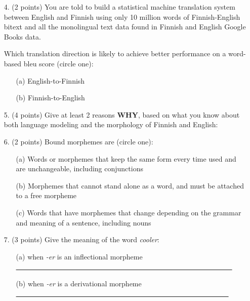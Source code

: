 \documentclass[12pt]{article}
\begin{document}
\begin{itemize}
\vspace{1cm}

\item[4.] (2 points) You are told to build a statistical machine translation system between English and Finnish using
only 10 million words of Finnish-English bitext and all the monolingual text data found in
Finnish and English Google Books data.

Which translation direction is likely to achieve better performance on a word-based bleu score (circle one):

\begin{itemize}
 \item[(a)] English-to-Finnish
 \item[(b)] Finnish-to-English
\end{itemize}

\vspace{1cm}

\item[5.] (4 points) Give at least 2 reasons {\bf WHY}, based on what you know about both language
modeling and the morphology of Finnish and English:

\vspace{3cm}


\item[6.] (2 points) Bound morphemes are (circle one):

\begin{itemize}
\item[(a)] Words or morphemes that keep the same form every time used and are unchangeable, including conjunctions
\item[(b)] Morphemes that cannot stand alone as a word, and must be attached to a free morpheme
\item[(c)] Words that have morphemes that change depending on the grammar and meaning of a sentence, including nouns
\end{itemize}

\vspace{1cm}


\item[7.] (3 points) Give the meaning of the word {\it cooler}:
\begin{itemize}
  \item[(a)] when {\it -er} is an inflectional morpheme  
    \underline{\ \ \ \ \ \ \ \ \ \ \ \ \ \ \ \ \ \ \ \ \ \ \ \ \ \ \ \ \ \ \ \  \ \ \ \ \ \ \ \ \ \ \ \ \ \ \ \ \ \ \ \ \ \ \ \ \ \ \ \ \ }
  \item[(b)] when {\it -er} is a derivational morpheme 
     \underline {
     \ \ \ \ \ \ \ \ \ \ \ \ \ \ \ \ \ \ \ \ \ \ \ \ \ \ \ \ \ \ \ \  \ \ \ \ \ \ \ \ \ \ \ \ \ \ \ \ \ \ \ \ \ \ \ \ \ \ \ \ }
\end{itemize}


\end{itemize}
\end{document}
